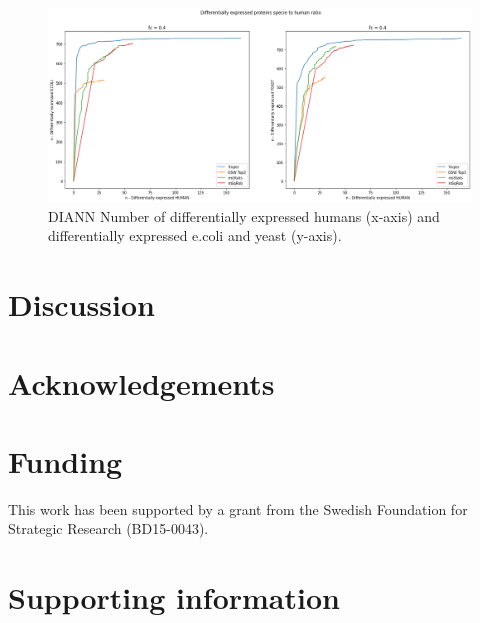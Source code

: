\documentclass[10pt,letterpaper]{article}
\begin{document}
\begin{figure}[H]
    \centering
    \includegraphics[width=12cm]{../../result/2021-08-13_docs_plots/DIANN_de_human_vs_de_specie.png}
    \caption{DIANN Number of differentially expressed humans (x-axis) and differentially expressed e.coli and yeast (y-axis).}
    \label{fig:osw_n_diff_exp}
\end{figure}

\section*{Discussion}

\section*{Acknowledgements}


\section*{Funding}

This work has been supported by a grant from the Swedish Foundation for Strategic Research (BD15-0043).

\section*{Supporting information}


%

\end{document}
